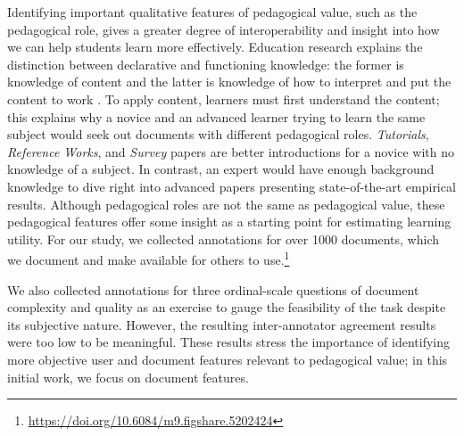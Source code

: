 \documentclass[11pt,a4paper]{article}
\begin{document}
Identifying important qualitative features of pedagogical value, such as the pedagogical role, gives a greater degree of interoperability and insight into how we can help students learn more effectively. Education research explains the distinction between declarative and functioning knowledge: the former is knowledge of content and the latter is knowledge of how to interpret and put the content to work \cite{biggs2011teaching}. To apply content, learners must first understand the content; this explains why a novice and an advanced learner trying to learn the same subject would seek out documents with different pedagogical roles. \textit{Tutorials}, \textit{Reference Works}, and \textit{Survey} papers are better introductions for a novice with no knowledge of a subject. In contrast, an expert would have enough background knowledge to dive right into advanced papers presenting state-of-the-art empirical results. Although pedagogical roles are not the same as pedagogical value, these pedagogical features offer some insight as a starting point for estimating learning utility. For our study, we collected annotations for over 1000 documents, which we document and make available for others to use.\footnote{\url{https://doi.org/10.6084/m9.figshare.5202424}}
%
%
%

We also collected annotations for three ordinal-scale questions of document complexity and quality as an exercise to gauge the feasibility of the task despite its subjective nature. However, the resulting inter-annotator agreement results were too low to be meaningful. These results stress the importance of identifying more objective user and document features relevant to pedagogical value; in this initial work, we focus on document features.
\end{document}
